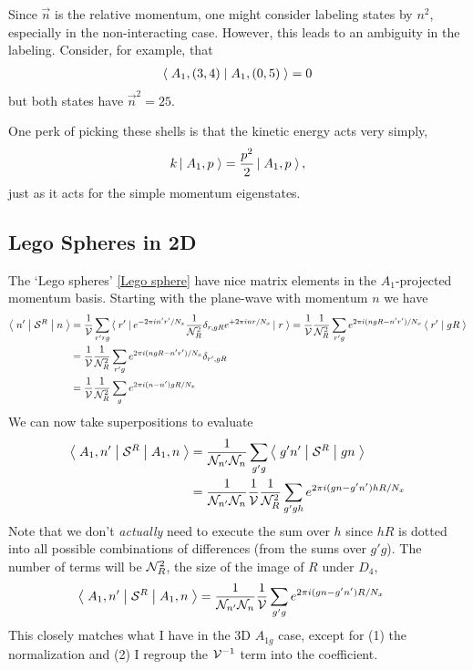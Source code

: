 Since $\vec{n}$ is the relative momentum, one might consider labeling states by $n^2$, especially in the non-interacting case.
However, this leads to an ambiguity in the labeling.
Consider, for example, that
\begin{align}
    \left\langle\;A_1, (3,4)\;\middle|\;A_1, (0,5)\;\right\rangle = 0
\end{align}
but both states have $\vec{n}^2=25$.

One perk of picking these shells is that the kinetic energy acts very simply,
\begin{align}
    k \left|\;A_1, p\;\right\rangle = \frac{p^2}{2} \left|\;A_1, p\;\right\rangle,
\end{align}
just as it acts for the simple momentum eigenstates.

\subsection{Lego Spheres in 2D}

The `Lego spheres' \eqref{Lego sphere} have nice matrix elements in the $A_1$-projected momentum basis.
Starting with the plane-wave with momentum $n$ we have
\begin{align}
    \left\langle\;n'\;\middle|\;\mathcal{S}^{R}\;\middle|\;n\;\right\rangle
    &=
    \frac{1}{\mathcal{V}} \sum_{r'rg} \left\langle\;r'\;\right| e^{-2\pi i n'r' / N_x} \frac{1}{\mathcal{N}_{R}^2} \delta_{r,gR} e^{+2\pi i nr / N_x} \left|\;r\;\right\rangle
    =
    \frac{1}{\mathcal{V}} \frac{1}{\mathcal{N}_{R}^2} \sum_{r'g} e^{2\pi i (n gR - n'r') / N_x} \left\langle\;r'\;\middle|\;gR\;\right\rangle
    \\
    &=
    \frac{1}{\mathcal{V}} \frac{1}{\mathcal{N}_{R}^2} \sum_{r'g} e^{2\pi i (n gR - n'r') / N_x} \delta_{r',gR}
    \\
    &=
    \frac{1}{\mathcal{V}} \frac{1}{\mathcal{N}_{R}^2} \sum_{g} e^{2\pi i (n-n') gR / N_x}
\end{align}
We can now take superpositions to evaluate
\begin{align}
    \left\langle\;A_1, n'\;\middle|\;\mathcal{S}^{R}\;\middle|\;A_1, n\;\right\rangle
    &=
    \frac{1}{\mathcal{N}_{n'}\mathcal{N}_{n}} \sum_{g'g} \left\langle\;g'n'\;\middle|\;\mathcal{S}^{R}\;\middle|\;gn\;\right\rangle
    \\
    &=
    \frac{1}{\mathcal{N}_{n'}\mathcal{N}_{n}} \frac{1}{\mathcal{V}}\frac{1}{\mathcal{N}_{R}^2} \sum_{g'gh} e^{2\pi i (gn-g'n') hR / N_x}
\end{align}
Note that we don't \emph{actually} need to execute the sum over $h$ since $hR$ is dotted into all possible combinations of differences (from the sums over $g'g$).
The number of terms will be $\mathcal{N}_{R}^2$, the size of the image of $R$ under $D_4$, 
\begin{align}
    \left\langle\;A_1, n'\;\middle|\;\mathcal{S}^{R}\;\middle|\;A_1, n\;\right\rangle
    &=
    \frac{1}{\mathcal{N}_{n'}\mathcal{N}_{n}} \frac{1}{\mathcal{V}} \sum_{g'g} e^{2\pi i (gn-g'n') R / N_x}
\end{align}
This closely matches what I have in the 3D $A_{1g}$ case, except for (1) the normalization and (2) I regroup the $\mathcal{V}^{-1}$ term into the coefficient.

